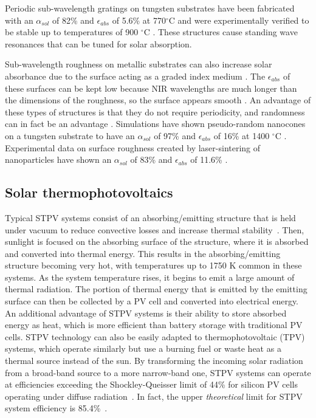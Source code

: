 \documentclass[review]{elsarticle}
\begin{document}
Periodic sub-wavelength gratings on tungsten substrates have been fabricated with an $\alpha_{sol}$ of 82\% and $\epsilon_{abs}$ of 5.6\% at 770$^\circ$C and were experimentally verified to be 
stable up to temperatures of 900 $^\circ$C \cite{A13}.  These structures cause standing wave resonances that can be tuned for solar absorption.

Sub-wavelength roughness on metallic substrates can also increase solar absorbance due to the surface acting as a graded index medium \cite{A13,A19}.  The $\epsilon_{abs}$ of these surfaces can be kept low because NIR wavelengths are much longer than the dimensions of the roughness, so the surface appears smooth \cite{A14}.  An advantage of these types of structures is that they do not require periodicity, and randomness can in fact be an advantage \cite{me1}.  Simulations have shown pseudo-random nanocones on a tungsten substrate to have an $\alpha_{sol}$ of 97\% and $\epsilon_{abs}$ of 16\% at 1400 $^\circ$C \cite{me1}.  Experimental data on surface roughness created by laser-sintering of nanoparticles have shown an $\alpha_{sol}$ of 83\% and $\epsilon_{abs}$ of 11.6\% \cite{g21}.

\subsection{Solar thermophotovoltaics}
Typical STPV systems consist of an absorbing/emitting structure that is held under vacuum to reduce convective losses and increase thermal stability~\cite{global_opt, convection}.  Then, sunlight is focused on the absorbing surface of the structure, where it is absorbed and converted into thermal energy.  This results in the absorbing/emitting structure becoming very hot, with temperatures up to 1750 K common in these systems.  As the system temperature rises, it begins to emit a large amount of thermal radiation.  The portion of thermal energy that is emitted by the emitting surface can then be collected by a PV cell and converted into electrical energy.  An additional advantage of STPV systems is their ability to store absorbed energy as heat, which is more efficient than battery storage with traditional PV cells.  STPV technology can also be easily adapted to thermophotovoltaic (TPV) systems, which operate similarly but use a burning fuel or waste heat as a thermal source instead of the sun. By transforming the incoming solar radiation from a broad-band source to a more narrow-band one, STPV systems can operate at efficiencies exceeding the Shockley-Queisser limit of 44\% for silicon PV cells operating under diffuse radiation~\cite{SQ}.  In fact, the upper {\it theoretical} limit for STPV system efficiency is 85.4\%~\cite{A2}.
\end{document}
